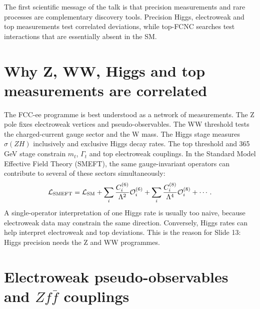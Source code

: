 \documentclass[11pt,a4paper]{report}
\begin{document}
\begin{keymessagebox}
The first scientific message of the talk is that precision measurements and rare processes are complementary discovery tools.  Precision Higgs, electroweak and top measurements test correlated deviations, while top-FCNC searches test interactions that are essentially absent in the SM.
\end{keymessagebox}

\section{Why Z, WW, Higgs and top measurements are correlated}
The FCC-ee programme is best understood as a network of measurements.  The Z pole fixes electroweak vertices and pseudo-observables.  The WW threshold tests the charged-current gauge sector and the W mass.  The Higgs stage measures $\sigma(ZH)$ inclusively and exclusive Higgs decay rates.  The top threshold and 365 GeV stage constrain $m_t$, $\Gamma_t$ and top electroweak couplings.  In the Standard Model Effective Field Theory (SMEFT), the same gauge-invariant operators can contribute to several of these sectors simultaneously:
\begin{equation}
  \mathcal L_{\rm SMEFT}=\mathcal L_{\rm SM}+
  \sum_i\frac{C_i^{(6)}}{\Lambda^2}\mathcal O_i^{(6)}+
  \sum_i\frac{C_i^{(8)}}{\Lambda^4}\mathcal O_i^{(8)}+\cdots .
\end{equation}
A single-operator interpretation of one Higgs rate is usually too naive, because electroweak data may constrain the same direction.  Conversely, Higgs rates can help interpret electroweak and top deviations.  This is the reason for Slide 13: Higgs precision needs the Z and WW programmes.


\section{Electroweak pseudo-observables and $Zf\bar f$ couplings}
\end{document}
